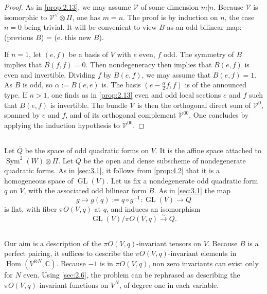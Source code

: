 \documentclass[11pt,a4paper]{article}
\theoremstyle{plain}
\theoremstyle{definition}
\DeclareMathOperator{\Hom}{Hom}
\DeclareMathOperator{\GL}{GL}
\DeclareMathOperator{\Sym}{Sym}
\newcommand{\C}{\mathbb{C}}
\begin{document}
\begin{proof}
As in \ref{prop:2.13}, we may assume $\mathcal{V}$ of some dimension $m|n$. Because $\mathcal{V}$ is isomorphic to $\mathcal{V}^\vee \otimes \Pi$, one has $m = n$. The proof is by induction on $n$, the case $n = 0$ being trivial. It will be convenient to view $B$ as an odd bilinear map: (previous $B$) = (e. this new $B$).

If $n = 1$, let $(e,f)$ be a basis of $V$ with $e$ even, $f$ odd. The symmetry of $B$ implies that $B(f,f) = 0$. Then nondegeneracy then implies that $B(e,f)$ is even and invertible. Dividing $f$ by $B(e,f)$, we may assume that $B(e,f) = 1$. As $B$ is odd, so $\alpha := B(e,e)$ is. The basis $(e - \frac{\alpha}{2}f, f)$ is of the announced type. If $n > 1$, one finds as in \ref{prop:2.13} even and odd local sections $e$ and $f$ such that $B(e,f)$ is invertible. The bundle $\mathcal{V}$ is then the orthogonal direct sum of $\mathcal{V}^0$, spanned by $e$ and $f$, and of its orthogonal complement $\mathcal{V}^{00}$. One concludes by applying the induction hypothesis to $\mathcal{V}^{00}$.
\end{proof}

\subsection{}
Let $\overline{Q}$ be the space of odd quadratic forms on $V$. It is the affine space attached to $\Sym^2(W) \otimes \Pi$. Let $Q$ be the open and dense subscheme of nondegenerate quadratic forms. As in \ref{sec:3.1}, it follows from \ref{prop:4.2} that it is a homogeneous space of $\GL(V)$. Let us fix a nondegenerate odd quadratic form $q$ on $V$, with the associated odd bilinear form $B$. As in \ref{sec:3.1} the map
\[
g \mapsto g(q) := q \circ g^{-1} : \GL(V) \to Q
\]
is flat, with fiber $\pi O(V,q)$ at $q$, and induces an isomorphism
\begin{equation}\label{eq:4.3.1}
\GL(V)/\pi O(V,q) \xrightarrow{\sim} Q.
\end{equation}

\subsection{}
Our aim is a description of the $\pi O(V,q)$-invariant tensors on $V$. Because $B$ is a perfect pairing, it suffices to describe the $\pi O(V,q)$-invariant elements in $\Hom(V^{\otimes N}, \C)$. Because $-1$ is in $\pi O(V,q)$, non zero invariants can exist only for $N$ even. Using \ref{sec:2.6}, the problem can be rephrased as describing the $\pi O(V,q)$-invariant functions on $V^N$, of degree one in each variable.
\end{document}
